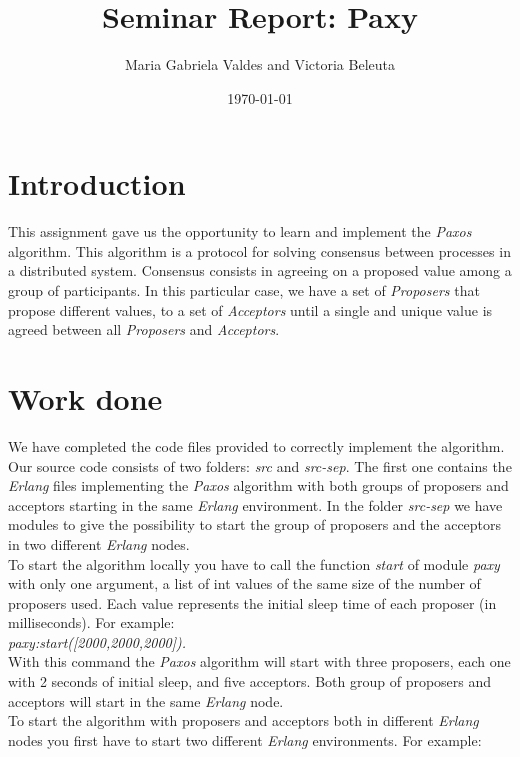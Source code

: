 \documentclass[a4paper, 11pt]{article}
\title{Seminar Report: Paxy}
\author{Maria Gabriela Valdes and Victoria Beleuta}
\date{\today{}}
\begin{document}
\maketitle

\section{Introduction}

This assignment gave us the opportunity to learn and implement the \textit{Paxos} algorithm. This algorithm is a protocol for solving consensus between processes in a distributed system. Consensus consists in agreeing on a proposed value among a group of participants. In this particular case, we have a set of \textit{Proposers} that propose different values, to a set of \textit{Acceptors} until a single and unique value is agreed between all \textit{Proposers} and \textit{Acceptors}.

\section{Work done}

We have completed the code files provided to correctly implement the algorithm. Our source code consists of two folders: \textit{src} and \textit{src-sep}. The first one contains the \textit{Erlang} files implementing the \textit{Paxos} algorithm with both groups of proposers and acceptors starting in the same \textit{Erlang} environment. In the folder \textit{src-sep} we have modules to give the possibility to start the group of proposers and the acceptors in two different \textit{Erlang} nodes.\\

To start the algorithm locally you have to call the function \textit{start} of module \textit{paxy} with only one argument, a list of int values of the same size of the number of proposers used. Each value represents the initial sleep time of each proposer (in milliseconds). For example: \\

\textit{paxy:start([2000,2000,2000]).}\\

With this command the \textit{Paxos} algorithm will start with three proposers, each one with 2 seconds of initial sleep, and five acceptors. Both group of proposers and acceptors will start in the same \textit{Erlang} node.\\

To start the algorithm with proposers and acceptors both in different \textit{Erlang} nodes you first have to start two different \textit{Erlang} environments. For example:\\
\end{document}
